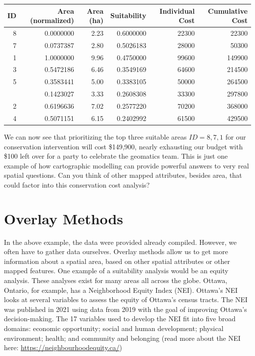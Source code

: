 \documentclass[
]{book}
\begin{document}
\begin{tabular}{rrrrrr}
\toprule
ID & Area (normalized) & Area (ha) & Suitability & Individual Cost & Cumulative Cost\\
\midrule
8 & 0.0000000 & 2.23 & 0.6000000 & 22300 & 22300\\
7 & 0.0737387 & 2.80 & 0.5026183 & 28000 & 50300\\
1 & 1.0000000 & 9.96 & 0.4750000 & 99600 & 149900\\
3 & 0.5472186 & 6.46 & 0.3549169 & 64600 & 214500\\
5 & 0.3583441 & 5.00 & 0.3383105 & 50000 & 264500\\
\addlinespace
6 & 0.1423027 & 3.33 & 0.2608308 & 33300 & 297800\\
2 & 0.6196636 & 7.02 & 0.2577220 & 70200 & 368000\\
4 & 0.5071151 & 6.15 & 0.2402992 & 61500 & 429500\\
\bottomrule
\end{tabular}

We can now see that prioritizing the top three suitable areas \(ID = {8,7,1}\) for our conservation intervention will cost \$149,900, nearly exhausting our budget with \$100 left over for a party to celebrate the geomatics team. This is just one example of how cartographic modelling can provide powerful answers to very real spatial questions. Can you think of other mapped attributes, besides area, that could factor into this conservation cost analysis?

\hypertarget{overlay-methods}{%
\section{Overlay Methods}\label{overlay-methods}}

In the above example, the data were provided already compiled. However, we often have to gather data ourselves. Overlay methods allow us to get more information about a spatial area, based on other spatial attributes or other mapped features. One example of a suitability analysis would be an equity analysis. These analyses exist for many areas all across the globe. Ottawa, Ontario, for example, has a Neighborhood Equity Index (NEI). Ottawa's NEI looks at several variables to assess the equity of Ottawa's census tracts. The NEI was published in 2021 using data from 2019 with the goal of improving Ottawa's decision-making. The 17 variables used to develop the NEI fit into five broad domains: economic opportunity; social and human development; physical environment; health; and community and belonging (read more about the NEI here: \url{https://neighbourhoodequity.ca/})
\end{document}
